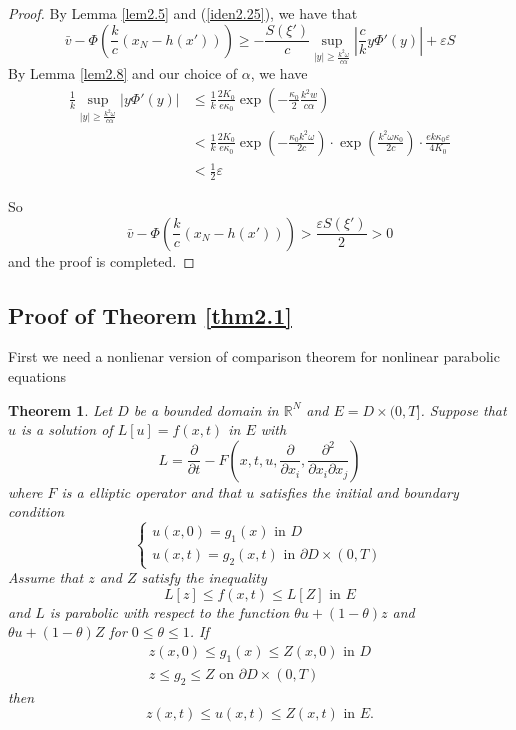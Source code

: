 \documentclass[12pt, a4paper]{article}
\newtheorem{thm}{Theorem}[section]
\numberwithin{equation}{section}
\newcommand{\R}{\mathbb{R}}
\newcommand{\pd}[2]{\frac{\partial #1}{\partial #2}}
\newcommand{\pddm}[3]{\frac{\partial^2 #1}{\partial #2\partial #3}}
\begin{document}
\begin{CJK}{UTF8}{bkai}
\begin{proof}
By Lemma \ref{lem2.5} and (\ref{iden2.25}), we have that
\[
	\bar{v}-\Phi\left(\frac{k}{c}(x_N-h(x'))\right)\geq-\frac{S(\xi')}{c}\sup_{|y|\geq\frac{k^2\omega}{c\alpha}}\left|\frac{c}{k}y\Phi'(y)\right|+\varepsilon S
\]
By Lemma \ref{lem2.8} and our choice of $\alpha$, we have
\begin{align*}
	\frac{1}{k}\sup_{|y|\geq\frac{k^2\omega}{c\alpha}}|y\Phi'(y)|&\leq\frac{1}{k}\frac{2K_0}{e\kappa_0}\exp(-\frac{\kappa_0}{2}\frac{k^2w}{c\alpha})\\
		&<\frac{1}{k}\frac{2K_0}{e\kappa_0}\exp(-\frac{\kappa_0k^2\omega}{2c})\cdot\exp(\frac{k^2\omega\kappa_0}{2c})\cdot\frac{ek\kappa_0\varepsilon}{4K_0}\\
		&<\frac{1}{2}\varepsilon
\end{align*}

So
\[
\bar{v}-\Phi\left(\frac{k}{c}(x_N-h(x'))\right)>\frac{\varepsilon S(\xi')}{2}>0
\]
and the proof is completed.
\end{proof}









\subsection{Proof of Theorem \ref{thm2.1}}

	First we need a nonlienar version of comparison theorem for nonlinear parabolic equations
\begin{thm}\cite[Theorem 12, p187-188]{PW1967}
	Let $D$ be a bounded domain in $\R^N$ and $E=D\times(0,T]$. Suppose that $u$ is a solution of $L[u]=f(x,t)$ in $E$ with 
\[
	L=\pd{}{t}-F\left(x,t,u,\pd{}{x_i},\pddm{}{x_i}{x_j}\right)
\]
where $F$ is a elliptic operator and that $u$ satisfies the initial and boundary condition
\[
\begin{cases}
	u(x,0)=g_1(x)\mbox{ in }D\\
	u(x,t)=g_2(x,t)\mbox{ in }\partial D\times(0,T)
\end{cases}
\]
Assume that $z$ and $Z$ satisfy the inequality
\[
	L[z]\leq f(x,t)\leq L[Z]\mbox{ in }E
\]
and $L$ is parabolic with respect to the function $\theta u+(1-\theta)z$ and $\theta u+(1-\theta)Z$ for $0\leq \theta\leq 1$. If
\begin{align*}
	z(x,0)\leq g_1(x)\leq Z(x,0)\mbox{ in }D\\
	z\leq g_2\leq Z\mbox{ on }\partial D\times(0,T)
\end{align*}
then
\[
	z(x,t)\leq u(x,t)\leq Z(x,t)\mbox{ in }E.
\]
\end{thm}


\end{CJK}
\end{document}
